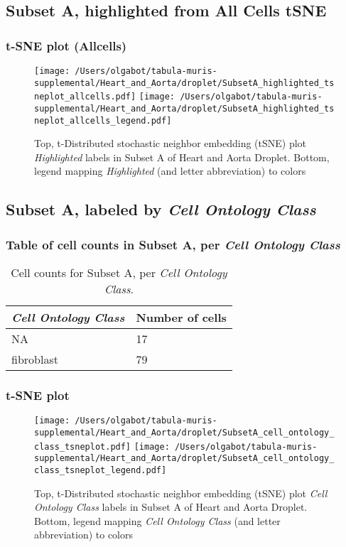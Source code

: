 \clearpage

\subsection{Subset A, highlighted from All Cells tSNE}

\subsubsection{t-SNE plot (Allcells)}
\begin{figure}[h]
\centering
\texttt{[image: /Users/olgabot/tabula-muris-supplemental/Heart\_and\_Aorta/droplet/SubsetA\_highlighted\_tsneplot\_allcells.pdf]}
\texttt{[image: /Users/olgabot/tabula-muris-supplemental/Heart\_and\_Aorta/droplet/SubsetA\_highlighted\_tsneplot\_allcells\_legend.pdf]}
\caption{Top, t-Distributed stochastic neighbor embedding (tSNE) plot  \emph{Highlighted} labels in Subset A of Heart and Aorta Droplet. Bottom, legend mapping \emph{Highlighted} (and letter abbreviation) to colors}
\end{figure}


\clearpage

\subsection{Subset A, labeled by \emph{Cell Ontology Class}}
\subsubsection{Table of cell counts in Subset A, per \emph{Cell Ontology Class}}\begin{table}[h]
\centering
\label{my-label}
\begin{tabular}{@{}ll@{}}
\toprule

\emph{Cell Ontology Class}& Number of cells \\ \midrule
NA & 17 \\

fibroblast & 79 \\
\bottomrule
\end{tabular}
\caption{Cell counts for Subset A, per \emph{Cell Ontology Class}.}
\end{table}

\clearpage
\subsubsection{t-SNE plot}
\begin{figure}[h]
\centering
\texttt{[image: /Users/olgabot/tabula-muris-supplemental/Heart\_and\_Aorta/droplet/SubsetA\_cell\_ontology\_class\_tsneplot.pdf]}
\texttt{[image: /Users/olgabot/tabula-muris-supplemental/Heart\_and\_Aorta/droplet/SubsetA\_cell\_ontology\_class\_tsneplot\_legend.pdf]}
\caption{Top, t-Distributed stochastic neighbor embedding (tSNE) plot  \emph{Cell Ontology Class} labels in Subset A of Heart and Aorta Droplet. Bottom, legend mapping \emph{Cell Ontology Class} (and letter abbreviation) to colors}
\end{figure}


